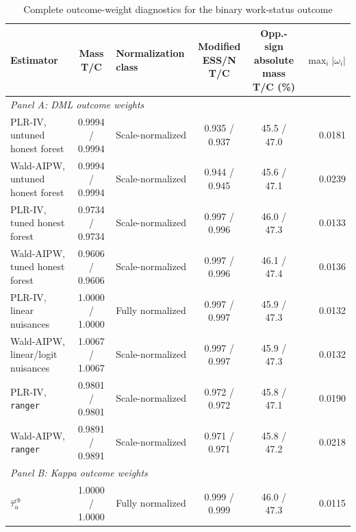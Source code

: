 \documentclass[12pt, a4paper, oneside]{article}
\theoremstyle{plain}
\theoremstyle{definition}
\begin{document}
\begin{table}[H]
\centering
\caption{Complete outcome-weight diagnostics for the binary work-status outcome}
\label{tab:child_weights_work_appendix}
\scriptsize
\setlength{\tabcolsep}{3pt}
\renewcommand{\arraystretch}{0.92}
\begin{threeparttable}
\begin{tabular}{@{}lclccr@{}}
\toprule
Estimator
& \shortstack{Mass\\T/C}
& Normalization class
& \shortstack{Modified ESS/N\\T/C}
& \shortstack{Opp.-sign absolute\\mass T/C (\%)}
& \(\max_i|\omega_i|\) \\
\midrule

\multicolumn{6}{l}{\textit{Panel A: DML outcome weights}} \\[2pt]

PLR-IV, untuned honest forest
& 0.9994 / 0.9994
& Scale-normalized
& 0.935 / 0.937
& 45.5 / 47.0
& 0.0181 \\

Wald-AIPW, untuned honest forest
& 0.9994 / 0.9994
& Scale-normalized
& 0.944 / 0.945
& 45.6 / 47.1
& 0.0239 \\

PLR-IV, tuned honest forest
& 0.9734 / 0.9734
& Scale-normalized
& 0.997 / 0.996
& 46.0 / 47.3
& 0.0133 \\

Wald-AIPW, tuned honest forest
& 0.9606 / 0.9606
& Scale-normalized
& 0.997 / 0.996
& 46.1 / 47.4
& 0.0136 \\

PLR-IV, linear nuisances
& 1.0000 / 1.0000
& Fully normalized
& 0.997 / 0.997
& 45.9 / 47.3
& 0.0132 \\

Wald-AIPW, linear/logit nuisances
& 1.0067 / 1.0067
& Scale-normalized
& 0.997 / 0.997
& 45.9 / 47.3
& 0.0132 \\

PLR-IV, \texttt{ranger}
& 0.9801 / 0.9801
& Scale-normalized
& 0.972 / 0.972
& 45.8 / 47.1
& 0.0190 \\

Wald-AIPW, \texttt{ranger}
& 0.9891 / 0.9891
& Scale-normalized
& 0.971 / 0.971
& 45.8 / 47.2
& 0.0218 \\[3pt]

\multicolumn{6}{l}{\textit{Panel B: Kappa outcome weights}} \\[2pt]

\(\widehat{\tau}^{cb}_{u}\)
& 1.0000 / 1.0000
& Fully normalized
& 0.999 / 0.999
& 46.0 / 47.3
& 0.0115 \\


\end{tabular}
\end{threeparttable}
\end{table}
\end{document}

